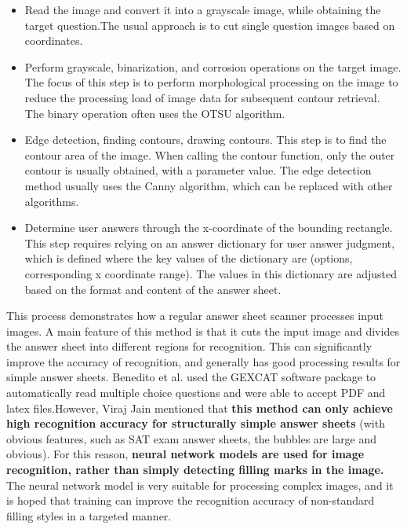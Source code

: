 \documentclass[twocolumn]{article}
\begin{document}
        \begin{itemize}
            \item Read the image and convert it into a grayscale image, while obtaining the target question.The usual approach is to cut single question images based on coordinates.
            \item Perform grayscale, binarization, and corrosion operations on the target image. The focus of this step is to perform morphological processing on the image to reduce the processing load of image data for subsequent contour retrieval. The binary operation often uses the OTSU algorithm\cite{OTSU}.
            \item Edge detection, finding contours, drawing contours. This step is to find the contour area of the image. When calling the contour function, only the outer contour is usually obtained, with a parameter value. The edge detection method usually uses the Canny algorithm\cite{canny}, which can be replaced with other algorithms.
            \item Determine user answers through the x-coordinate of the bounding rectangle. This step requires relying on an answer dictionary for user answer judgment, which is defined  where the key values of the dictionary are (options, corresponding x coordinate range). The values in this dictionary are adjusted based on the format and content of the answer sheet\cite{canny_wiki}.
        \end{itemize}

        This process demonstrates how a regular answer sheet scanner processes input images. A main feature of this method is that it cuts the input image and divides the answer sheet into different regions for recognition. This can significantly improve the accuracy of recognition\cite{Meesad}, and generally has good processing results for simple answer sheets. Benedito et al.\cite{Optical} used the GEXCAT software package to automatically read multiple choice questions and were able to accept PDF and latex files.However, Viraj Jain\cite{OMR_ieee1} mentioned that \textbf{this method can only achieve high recognition accuracy for structurally simple answer sheets} (with obvious features, such as SAT exam answer sheets, the bubbles are large and obvious). For this reason, \textbf{ neural network models are used for image recognition, rather than simply detecting filling marks in the image.} The neural network model is very suitable for processing complex images, and it is hoped that training can improve the recognition accuracy of non-standard filling styles in a targeted manner.
\end{document}
